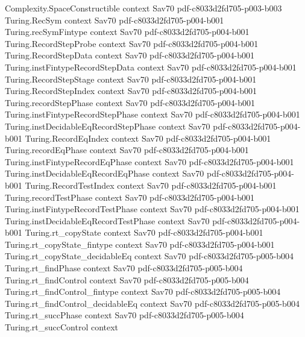 \begin{theorem}
\proofstep
  {Complexity.SpaceConstructible}
  {context}
  {Sav70}
  {pdf-c8033d2fd705-p003-b003}
\proofstep
  {Turing.RecSym}
  {context}
  {Sav70}
  {pdf-c8033d2fd705-p004-b001}
\proofstep
  {Turing.recSymFintype}
  {context}
  {Sav70}
  {pdf-c8033d2fd705-p004-b001}
\proofstep
  {Turing.RecordStepProbe}
  {context}
  {Sav70}
  {pdf-c8033d2fd705-p004-b001}
\proofstep
  {Turing.RecordStepData}
  {context}
  {Sav70}
  {pdf-c8033d2fd705-p004-b001}
\proofstep
  {Turing.instFintypeRecordStepData}
  {context}
  {Sav70}
  {pdf-c8033d2fd705-p004-b001}
\proofstep
  {Turing.RecordStepStage}
  {context}
  {Sav70}
  {pdf-c8033d2fd705-p004-b001}
\proofstep
  {Turing.RecordStepIndex}
  {context}
  {Sav70}
  {pdf-c8033d2fd705-p004-b001}
\proofstep
  {Turing.recordStepPhase}
  {context}
  {Sav70}
  {pdf-c8033d2fd705-p004-b001}
\proofstep
  {Turing.instFintypeRecordStepPhase}
  {context}
  {Sav70}
  {pdf-c8033d2fd705-p004-b001}
\proofstep
  {Turing.instDecidableEqRecordStepPhase}
  {context}
  {Sav70}
  {pdf-c8033d2fd705-p004-b001}
\proofstep
  {Turing.RecordEqIndex}
  {context}
  {Sav70}
  {pdf-c8033d2fd705-p004-b001}
\proofstep
  {Turing.recordEqPhase}
  {context}
  {Sav70}
  {pdf-c8033d2fd705-p004-b001}
\proofstep
  {Turing.instFintypeRecordEqPhase}
  {context}
  {Sav70}
  {pdf-c8033d2fd705-p004-b001}
\proofstep
  {Turing.instDecidableEqRecordEqPhase}
  {context}
  {Sav70}
  {pdf-c8033d2fd705-p004-b001}
\proofstep
  {Turing.RecordTestIndex}
  {context}
  {Sav70}
  {pdf-c8033d2fd705-p004-b001}
\proofstep
  {Turing.recordTestPhase}
  {context}
  {Sav70}
  {pdf-c8033d2fd705-p004-b001}
\proofstep
  {Turing.instFintypeRecordTestPhase}
  {context}
  {Sav70}
  {pdf-c8033d2fd705-p004-b001}
\proofstep
  {Turing.instDecidableEqRecordTestPhase}
  {context}
  {Sav70}
  {pdf-c8033d2fd705-p004-b001}
\proofstep
  {Turing.rt_copyState}
  {context}
  {Sav70}
  {pdf-c8033d2fd705-p004-b001}
\proofstep
  {Turing.rt_copyState_fintype}
  {context}
  {Sav70}
  {pdf-c8033d2fd705-p004-b001}
\proofstep
  {Turing.rt_copyState_decidableEq}
  {context}
  {Sav70}
  {pdf-c8033d2fd705-p005-b004}
\proofstep
  {Turing.rt_findPhase}
  {context}
  {Sav70}
  {pdf-c8033d2fd705-p005-b004}
\proofstep
  {Turing.rt_findControl}
  {context}
  {Sav70}
  {pdf-c8033d2fd705-p005-b004}
\proofstep
  {Turing.rt_findControl_fintype}
  {context}
  {Sav70}
  {pdf-c8033d2fd705-p005-b004}
\proofstep
  {Turing.rt_findControl_decidableEq}
  {context}
  {Sav70}
  {pdf-c8033d2fd705-p005-b004}
\proofstep
  {Turing.rt_succPhase}
  {context}
  {Sav70}
  {pdf-c8033d2fd705-p005-b004}
\proofstep
  {Turing.rt_succControl}
  {context}

\end{theorem}
